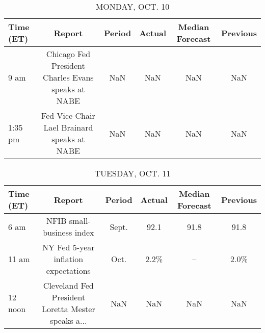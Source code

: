 \documentclass{article}%
\begin{document}
%
\normalsize%


\begin{table}[htbp]%
\caption{MONDAY, OCT. 10}%
\centering%
\begin{adjustbox}{width=1\textwidth}%
\begin{tabular}{lccccc}
\toprule
Time (ET) &                                             Report & Period & Actual & Median Forecast & Previous \\
\midrule
     9 am & Chicago Fed President Charles Evans speaks at NABE &    NaN &    NaN &             NaN &      NaN \\
  1:35 pm &        Fed Vice Chair Lael Brainard speaks at NABE &    NaN &    NaN &             NaN &      NaN \\
\bottomrule
\end{tabular}
%
\end{adjustbox}%
\end{table}

%


\begin{table}[htbp]%
\caption{TUESDAY, OCT. 11}%
\centering%
\begin{adjustbox}{width=1\textwidth}%
\begin{tabular}{lccccc}
\toprule
Time (ET) &                                             Report & Period & Actual & Median Forecast & Previous \\
\midrule
     6 am &                          NFIB small-business index &  Sept. &   92.1 &            91.8 &     91.8 \\
    11 am &               NY Fed 5-year inflation expectations &   Oct. &   2.2\% &              -- &     2.0\% \\
  12 noon & Cleveland Fed President Loretta Mester speaks a... &    NaN &    NaN &             NaN &      NaN \\
\bottomrule
\end{tabular}
%
\end{adjustbox}%
\end{table}

%
\end{document}
